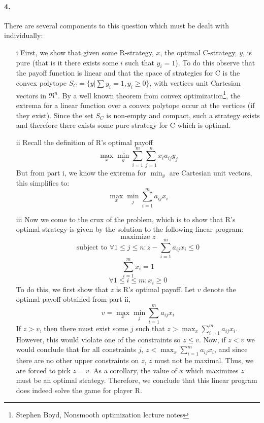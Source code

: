 \documentclass{article}
\begin{document}
\paragraph{4.} There are several components to this question which must be dealt with individually:
\begin{itemize}
\item[i] First, we show that given some R-strategy, $x$, the optimal C-strategy, $y$, is pure (that is it there exists some $i$ such that $y_i = 1$).  To do this observe that the payoff function is linear and that the space of strategies for C is the convex polytope $S_C = \{ y | \sum y_i = 1, y_i \geq 0 \}$, with vertices unit Cartesian vectors in $\Re^n$.  By a well known theorem from convex optimization\footnote{Stephen Boyd, Nonsmooth optimization lecture notes}, the extrema for a linear function over a convex polytope occur at the vertices (if they exist).  Since the set $S_C$ is non-empty and compact, such a strategy exists and therefore there exists some pure strategy for C which is optimal.
\item[ii] Recall the definition of R's optimal payoff
\[ \max_x \min_y \sum \limits_{i=1}^m \sum \limits_{j=1}^n x_i a_{ij} y_j \]
But from part i, we know the extrema for $\min_y$ are Cartesian unit vectors, this simplifies to:
\[ \max_x \min_j \sum \limits_{i=1}^m a_{ij} x_i \]
\item[iii] Now we come to the crux of the problem, which is to show that R's optimal strategy is given by the solution to the following linear program:
\[ \textrm{maximize } z \]
\[ \textrm{subject to } \forall 1 \leq j \leq n : z - \sum \limits_{i=1}^m a_{ij} x_i \leq 0 \]
\[ \sum \limits_{i=1}^m x_i = 1 \]
\[ \forall 1 \leq i \leq m : x_i \geq 0 \]
To do this, we first show that $z$ is R's optimal payoff.  Let $v$ denote the optimal payoff obtained from part ii,
\[ v = \max_x \min_j \sum \limits_{i=1}^m a_{ij} x_i \]
If $z > v$, then there must exist some $j$ such that $z > \max_x \sum \limits_{i=1}^m a_{ij} x_i$.  However, this would violate one of the constraints so $z \leq v$.  Now, if $z < v$ we would conclude that for all constraints $j$, $z < \max_x \sum \limits_{i=1}^m a_{ij} x_i$, and since there are no other upper constraints on $z$, $z$ must not be maximal.  Thus, we are forced to pick $z = v$.  As a corollary, the value of $x$ which maximizes $z$ must be an optimal strategy.  Therefore, we conclude that this linear program does indeed solve the game for player R.


\end{itemize}
\end{document}
